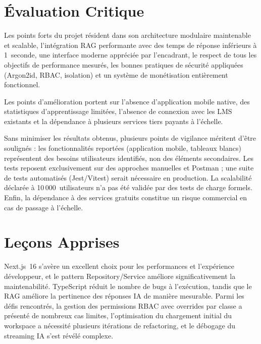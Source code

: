 \documentclass[12pt, a4paper, twoside]{report}
\begin{document}
\section{Évaluation Critique}

Les points forts du projet résident dans son architecture modulaire maintenable et
scalable, l'intégration RAG performante avec des temps de réponse inférieurs à
1~seconde, une interface moderne appréciée par l'encadrant, le respect de tous les
objectifs de performance mesurés, les bonnes pratiques de sécurité appliquées
(Argon2id, RBAC, isolation) et un système de monétisation entièrement fonctionnel.

Les points d'amélioration portent sur l'absence d'application mobile native, des
statistiques d'apprentissage limitées, l'absence de connexion avec les LMS
existants et la dépendance à plusieurs services tiers payants à l'échelle.

Sans minimiser les résultats obtenus, plusieurs points de vigilance méritent d'être
soulignés : les fonctionnalités reportées (application mobile, tableaux blancs)
représentent des besoins utilisateurs identifiés, non des éléments secondaires. Les
tests reposent exclusivement sur des approches manuelles et Postman ; une suite de
tests automatisés (Jest/Vitest) serait nécessaire en production. La scalabilité
déclarée à 10\,000~utilisateurs n'a pas été validée par des tests de charge
formels. Enfin, la dépendance à des services gratuits constitue un risque
commercial en cas de passage à l'échelle.

\section{Leçons Apprises}

Next.js~16 s'avère un excellent choix pour les performances et l'expérience
développeur, et le pattern Repository/Service améliore significativement la
maintenabilité. TypeScript réduit le nombre de bugs à l'exécution, tandis que le
RAG améliore la pertinence des réponses IA de manière mesurable. Parmi les défis
rencontrés, la gestion des permissions RBAC avec overrides par classe a présenté
de nombreux cas limites, l'optimisation du chargement initial du workspace a
nécessité plusieurs itérations de refactoring, et le débogage du streaming IA
s'est révélé complexe.

\end{document}
